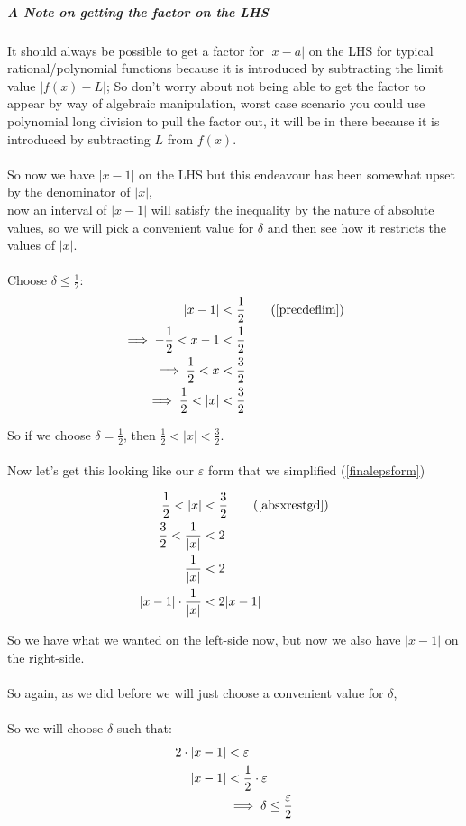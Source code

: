 \documentclass[class=article, crop=false]{standalone}
\begin{document}
\subparagraph{A Note on getting the factor on the LHS}
It should always be possible to get a factor for $|x-a|$ on the LHS for typical rational/polynomial functions because it is introduced by subtracting the limit value $|f(x)-L|$; So don't worry about not being able to get the factor to appear by way of algebraic manipulation, worst case scenario you could use polynomial long division to pull the factor out, it will be in there because it is introduced by subtracting $L$ from $f(x)$.\\
\ \\

So now we have $\lvert x-1 \rvert$ on the LHS but this endeavour has been somewhat upset by the denominator of $\lvert x \rvert$, \\
now an interval of $\lvert x-1 \rvert$ will satisfy the inequality by the nature of absolute values, so we will pick a convenient value for $\delta$ and then see how it restricts the values of $\lvert x \rvert$. \\


\ \\
Choose $\delta \leq \frac{1}{2}$:
\begin{align}
  \lvert x - 1 \rvert &< \frac{1}{2} 
  \tag{\ref{precdeflim}} \\
  \implies -\frac{1}{2} < x-1 &< \frac{1}{2} \notag \\
  \implies \frac{1}{2} < x &< \frac{3}{2} \notag \\
  \implies \frac{1}{2} < \lvert x \rvert &< \frac{3}{2} \label{absxrestgd}
\end{align}


So if we choose $\delta = \frac{1}{2}$, then $\frac{1}{2} < \lvert x \rvert < \frac{3}{2}$.\\
\ \\
Now let's get this looking like our $\varepsilon$ form that we simplified (\ref{finalepsform}) 

\begin{align}
  \frac{1}{2} < \lvert x \rvert &< \frac{3}{2} \tag{\ref{absxrestgd}} \\
  \frac{3}{2} < \frac{1}{\lvert x \rvert} &< 2 \notag \\
   \frac{1}{\lvert x \rvert} &< 2 \notag \\
   \lvert x-1 \rvert \cdot   \frac{1}{\lvert x \rvert} &< 2 \lvert x-1 \rvert \label{nearth}
\end{align}

So we have what we wanted on the left-side now, but now we also have $\lvert x-1 \rvert$ on the right-side.\\
\ \\
So again, as we did before we will just choose a convenient value for $\delta$,\\
\ \\
So we will choose $\delta$ such that: 
\begin{align}
  2 \cdot \lvert x-1 \rvert &< \varepsilon \notag \\
  \lvert x-1 \rvert &< \frac{1}{2} \cdot \varepsilon \notag \\
  &\implies \delta \leq \frac{\varepsilon}{2} \label{initdelval}
\end{align}
\end{document}
